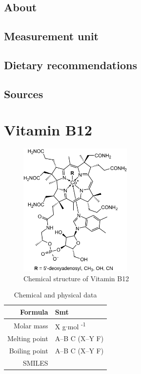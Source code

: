 \documentclass{book}
\begin{document}
\section{About}


\section{Measurement unit}


\section{Dietary recommendations}


\section{Sources}


\chapter{Vitamin B12}
\begin{figure}[h]
	\caption{Chemical structure of Vitamin B12}
	\centering \includegraphics[width=0.5\textwidth]{images/Vitamin_B12_chemical_structure}
\end{figure}

\begin{table}[h]
	\caption{Chemical and physical data}
	\centering \begin{tabular}{| r | l |}
		\hline
		Formula & Smt\\ \hline
		Molar mass & X g$\cdot$mol \textsuperscript{-1}\\ \hline
		Melting point & A--B \degree C (X--Y \degree F)\\ \hline
		Boiling point & A--B \degree C (X--Y \degree F)\\ \hline
		SMILES & \\ \hline
	\end{tabular}
\end{table}
\newpage
\end{document}
